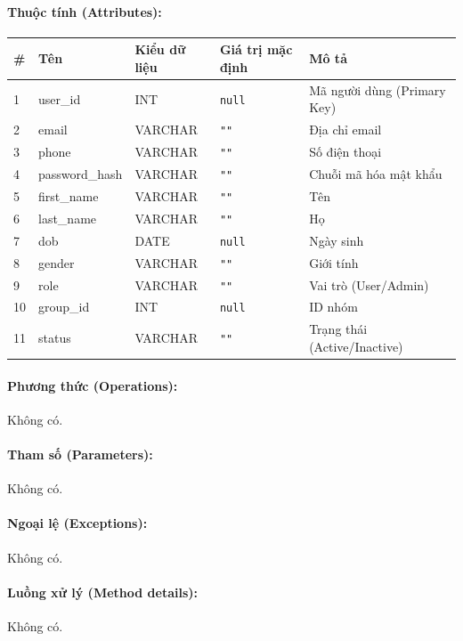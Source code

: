 \documentclass[12pt,a4paper]{article}
\begin{document}
\paragraph{Thuộc tính (Attributes):}
\begin{longtable}{|p{0.6cm}|p{2.8cm}|p{2.2cm}|p{1.8cm}|p{5.8cm}|}
\hline
\textbf{\#} & \textbf{Tên} & \textbf{Kiểu dữ liệu} & \textbf{Giá trị mặc định} & \textbf{Mô tả} \\ \hline
\endhead
1 & user\_id & INT & \texttt{null} & Mã người dùng (Primary Key) \\ \hline
2 & email & VARCHAR & \texttt{""} & Địa chỉ email \\ \hline
3 & phone & VARCHAR & \texttt{""} & Số điện thoại \\ \hline
4 & password\_hash & VARCHAR & \texttt{""} & Chuỗi mã hóa mật khẩu \\ \hline
5 & first\_name & VARCHAR & \texttt{""} & Tên \\ \hline
6 & last\_name & VARCHAR & \texttt{""} & Họ \\ \hline
7 & dob & DATE & \texttt{null} & Ngày sinh \\ \hline
8 & gender & VARCHAR & \texttt{""} & Giới tính \\ \hline
9 & role & VARCHAR & \texttt{""} & Vai trò (User/Admin) \\ \hline
10 & group\_id & INT & \texttt{null} & ID nhóm \\ \hline
11 & status & VARCHAR & \texttt{""} & Trạng thái (Active/Inactive) \\ \hline
\end{longtable}

\paragraph{Phương thức (Operations):}
Không có.

\paragraph{Tham số (Parameters):}
Không có.

\paragraph{Ngoại lệ (Exceptions):}
Không có.

\paragraph{Luồng xử lý (Method details):}
Không có.
\end{document}
